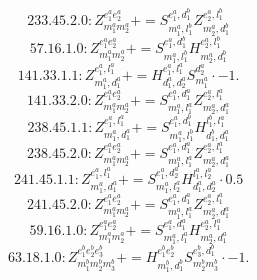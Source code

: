 \documentclass[letterpaper,10pt,fleqn,leqno,onecolumn]{article}
\begin{document}
\begin{equation} \;\;\;\;\;\;  233.45.2.0: Z^{e_{1}^{a}e_{2}^{a}}_{m_{1}^{a}m_{2}^{a}}+=S^{e_{1}^{a},d_{1}^{b}}_{m_{1}^{a},l_{1}^{b}}Z^{e_{2}^{a},l_{1}^{b}}_{m_{2}^{a},d_{1}^{b}} \end{equation}
\begin{equation} \;\;\;\;\;\;  57.16.1.0: Z^{e_{1}^{a}e_{2}^{a}}_{m_{1}^{a}m_{2}^{a}}+=S^{e_{1}^{a},d_{1}^{b}}_{m_{1}^{a},l_{1}^{b}}H^{e_{2}^{a},l_{1}^{b}}_{m_{2}^{a},d_{1}^{b}} \end{equation}
\begin{equation} \;\;\;\;\;\;  141.33.1.1: Z^{e_{1}^{a},l_{1}^{a}}_{m_{1}^{a},d_{1}^{a}}+=H^{e_{1}^{a},l_{1}^{a}}_{d_{1}^{a},d_{2}^{a}}S^{d_{2}^{a}}_{m_{1}^{a}}\cdot -1. \end{equation}
\begin{equation} \;\;\;\;\;\;  141.33.2.0: Z^{e_{1}^{a}e_{2}^{a}}_{m_{1}^{a}m_{2}^{a}}+=S^{e_{1}^{a},d_{1}^{a}}_{m_{1}^{a},l_{1}^{a}}Z^{e_{2}^{a},l_{1}^{a}}_{m_{2}^{a},d_{1}^{a}} \end{equation}
\begin{equation} \;\;\;\;\;\;  238.45.1.1: Z^{e_{1}^{a},l_{1}^{a}}_{m_{1}^{a},d_{1}^{a}}+=S^{e_{1}^{a},d_{1}^{b}}_{m_{1}^{a},l_{1}^{b}}H^{l_{1}^{b},l_{1}^{a}}_{d_{1}^{b},d_{1}^{a}} \end{equation}
\begin{equation} \;\;\;\;\;\;  238.45.2.0: Z^{e_{1}^{a}e_{2}^{a}}_{m_{1}^{a}m_{2}^{a}}+=S^{e_{1}^{a},d_{1}^{a}}_{m_{1}^{a},l_{1}^{a}}Z^{e_{2}^{a},l_{1}^{a}}_{m_{2}^{a},d_{1}^{a}} \end{equation}
\begin{equation} \;\;\;\;\;\;  241.45.1.1: Z^{e_{1}^{a},l_{1}^{a}}_{m_{1}^{a},d_{1}^{a}}+=S^{e_{1}^{a},d_{2}^{a}}_{m_{1}^{a},l_{2}^{a}}H^{l_{1}^{a},l_{2}^{a}}_{d_{1}^{a},d_{2}^{a}}\cdot 0.5 \end{equation}
\begin{equation} \;\;\;\;\;\;  241.45.2.0: Z^{e_{1}^{a}e_{2}^{a}}_{m_{1}^{a}m_{2}^{a}}+=S^{e_{1}^{a},d_{1}^{a}}_{m_{1}^{a},l_{1}^{a}}Z^{e_{2}^{a},l_{1}^{a}}_{m_{2}^{a},d_{1}^{a}} \end{equation}
\begin{equation} \;\;\;\;\;\;  59.16.1.0: Z^{e_{1}^{a}e_{2}^{a}}_{m_{1}^{a}m_{2}^{a}}+=S^{e_{1}^{a},d_{1}^{a}}_{m_{1}^{a},l_{1}^{a}}H^{e_{2}^{a},l_{1}^{a}}_{m_{2}^{a},d_{1}^{a}} \end{equation}
\begin{equation} \;\;\;\;\;\;  63.18.1.0: Z^{e_{1}^{b}e_{2}^{b}e_{3}^{b}}_{m_{1}^{b}m_{2}^{b}m_{3}^{b}}+=H^{e_{1}^{b}e_{2}^{b}}_{m_{1}^{b},d_{1}^{b}}S^{e_{3}^{b},d_{1}^{b}}_{m_{2}^{b}m_{3}^{b}}\cdot -1. \end{equation}
\end{document}
